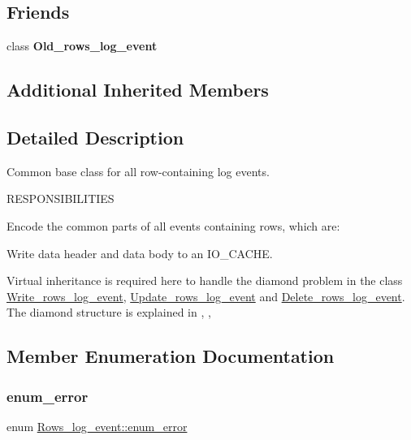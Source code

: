 \subsection*{Friends}
\begin{DoxyCompactItemize}
\item 
\mbox{\label{classRows__log__event_af1f35e123eb714eb1e82361a58ecbe60}} 
class {\bfseries Old\+\_\+rows\+\_\+log\+\_\+event}
\end{DoxyCompactItemize}
\subsection*{Additional Inherited Members}


\subsection{Detailed Description}
Common base class for all row-\/containing log events.

R\+E\+S\+P\+O\+N\+S\+I\+B\+I\+L\+I\+T\+I\+ES

Encode the common parts of all events containing rows, which are\+:
\begin{DoxyItemize}
\item Write data header and data body to an I\+O\+\_\+\+C\+A\+C\+HE.
\end{DoxyItemize}

Virtual inheritance is required here to handle the diamond problem in the class \mbox{\hyperlink{classWrite__rows__log__event}{Write\+\_\+rows\+\_\+log\+\_\+event}}, \mbox{\hyperlink{classUpdate__rows__log__event}{Update\+\_\+rows\+\_\+log\+\_\+event}} and \mbox{\hyperlink{classDelete__rows__log__event}{Delete\+\_\+rows\+\_\+log\+\_\+event}}. The diamond structure is explained in , ,  

\subsection{Member Enumeration Documentation}
\mbox{\label{classRows__log__event_ad4f2f3d052f398cc4f3c32731a4f9b35}} 
\subsubsection{\texorpdfstring{enum\+\_\+error}{enum\_error}}
{\footnotesize\ttfamily enum \mbox{\hyperlink{classRows__log__event_ad4f2f3d052f398cc4f3c32731a4f9b35}{Rows\+\_\+log\+\_\+event\+::enum\+\_\+error}}}

